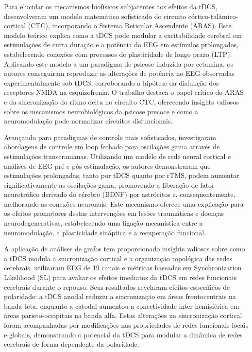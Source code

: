 Para elucidar os mecanismos biofísicos subjacentes aos efeitos da tDCS,  desenvolveram um modelo matemático sofisticado do circuito córtico-talâmico-cortical (CTC), incorporando o Sistema Reticular Ascendente (ARAS). Este modelo teórico explica como a tDCS pode modular a excitabilidade cerebral em estimulações de curta duração e a potência do EEG em estímulos prolongados, estabelecendo conexões com processos de plasticidade de longo prazo (LTP). Aplicando este modelo a um paradigma de psicose induzida por cetamina, os autores conseguiram reproduzir as alterações de potência no EEG observadas experimentalmente sob tDCS, corroborando a hipótese da disfunção dos receptores NMDA na esquizofrenia. O trabalho destaca o papel crítico do ARAS e da sincronização do ritmo delta no circuito CTC, oferecendo insights valiosos sobre os mecanismos neurobiológicos da psicose precoce e como a neuromodulação pode normalizar circuitos disfuncionais.

Avançando para paradigmas de controle mais sofisticados,  investigaram abordagens de controle em loop fechado para oscilações gama através de estimulações transcranianas. Utilizando um modelo de rede neural cortical e análises de EEG pré e pós-estimulação, os autores demonstraram que estimulações prolongadas, tanto por tDCS quanto por rTMS, podem aumentar significativamente as oscilações gama, promovendo a liberação de fator neurotrófico derivado do cérebro (BDNF) por astrócitos e, consequentemente, melhorando as conexões neuronais. Este mecanismo oferece uma explicação para os efeitos promotores destas intervenções em lesões traumáticas e doenças neurodegenerativas, estabelecendo uma ligação mecanística entre a neuromodulação, a plasticidade sináptica e a recuperação funcional.

A aplicação de análises de grafos tem proporcionado insights valiosos sobre como a tDCS modula a sincronização cortical e a organização topológica das redes cerebrais.  utilizaram EEG de 19 canais e métricas baseadas em Synchronization Likelihood (SL) para avaliar os efeitos imediatos da tDCS em redes funcionais cerebrais durante o repouso. Seus resultados revelaram efeitos específicos de polaridade: a tDCS anodal reduziu a sincronização em áreas frontocentrais na banda teta, enquanto a catodal aumentou a conectividade inter-hemisférica em áreas parieto-occipitais na banda alfa. Estas alterações na sincronização cortical foram acompanhadas por modificações nas propriedades de redes funcionais locais e globais, demonstrando o potencial da tDCS para modular a dinâmica de redes cerebrais de forma dependente da polaridade.

